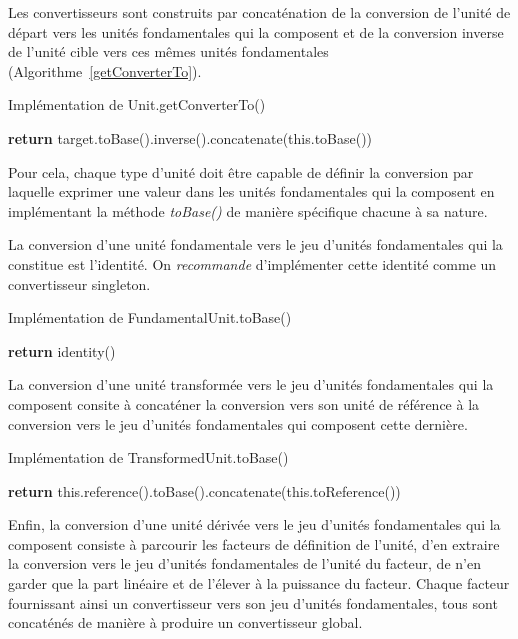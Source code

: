 \documentclass[a4paper,draft,twoside,10pt]{article}
\begin{document}
Les convertisseurs sont construits par concaténation de la conversion de l'unité de départ vers les unités fondamentales
qui la composent et de la conversion inverse de l'unité cible vers ces mêmes unités fondamentales
(Algorithme~\ref{getConverterTo}).

\begin{algorithm}[!h]
\caption{Implémentation de Unit.getConverterTo()}\label{getConverterTo}
\begin{algorithmic}
\State \textbf{return} target.toBase().inverse().concatenate(this.toBase())
\EndProcedure
\end{algorithmic}
\end{algorithm}

Pour cela, chaque type d'unité doit être capable de définir la conversion par laquelle exprimer une valeur dans les
unités fondamentales qui la composent en implémentant la méthode \emph{toBase()} de manière spécifique chacune à sa
nature.

La conversion d'une unité fondamentale vers le jeu d'unités fondamentales qui la constitue est l'identité. On
\emph{recommande} d'implémenter cette identité comme un convertisseur singleton.

\begin{algorithm}[!h]
\caption{Implémentation de FundamentalUnit.toBase()}\label{fundamentalToBase}
\begin{algorithmic}
\State \textbf{return} identity()
\EndProcedure
\end{algorithmic}
\end{algorithm}

La conversion d'une unité transformée vers le jeu d'unités fondamentales qui la composent consite à concaténer la
conversion vers son unité de référence à la conversion vers le jeu d'unités fondamentales qui composent cette dernière.

\begin{algorithm}[!h]
\caption{Implémentation de TransformedUnit.toBase()}\label{transformedToBase}
\begin{algorithmic}
\State \textbf{return} this.reference().toBase().concatenate(this.toReference())
\EndProcedure
\end{algorithmic}
\end{algorithm}

Enfin, la conversion d'une unité dérivée vers le jeu d'unités fondamentales qui la composent consiste à parcourir les
facteurs de définition de l'unité, d'en extraire la conversion vers le jeu d'unités fondamentales de l'unité du facteur,
de n'en garder que la part linéaire et de l'élever à la puissance du facteur. Chaque facteur fournissant ainsi un
convertisseur vers son jeu d'unités fondamentales, tous sont concaténés de manière à produire un convertisseur global.
\end{document}
